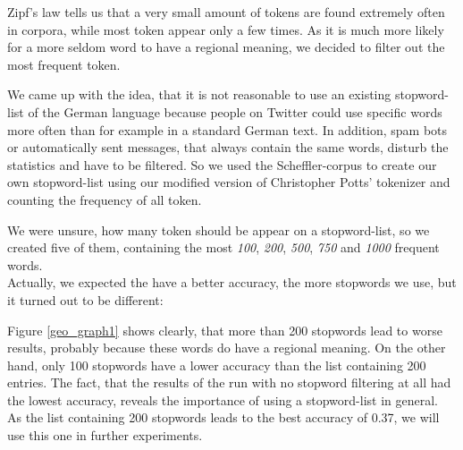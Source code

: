 \documentclass[../Main.tex]{subfiles}
\begin{document}
Zipf's law tells us that a very small amount of tokens are found extremely often in corpora, while most token appear only a few times. As it is much more likely for a more seldom word to have a regional meaning, we decided to filter out the most frequent token. 

We came up with the idea, that it is not reasonable to use an existing stopword-list of the German language because people on Twitter could use specific words more often than for example in a standard German text. In addition, spam bots or automatically sent messages, that always contain the same words, disturb the statistics and have to be filtered. So we used the Scheffler-corpus to create our own stopword-list using our modified version of Christopher Potts' tokenizer and counting the frequency of all token.

We were unsure, how many token should be appear on a stopword-list, so we created five of them, containing the most \emph{100}, \emph{200}, \emph{500}, \emph{750} and \emph{1000} frequent words.\\
Actually, we expected the have a better accuracy, the more stopwords we use, but it turned out to be different: 

Figure \ref{geo_graph1} shows clearly, that more than 200 stopwords lead to worse results, probably because these words do have a regional meaning. On the other hand, only 100 stopwords have a lower accuracy  than the list containing 200 entries. The fact, that the results of the run with no stopword filtering at all had the lowest accuracy, reveals the importance of using a stopword-list in general.\\
As the list containing 200 stopwords leads to the best accuracy of 0.37, we will use this one in further experiments.
\end{document}
